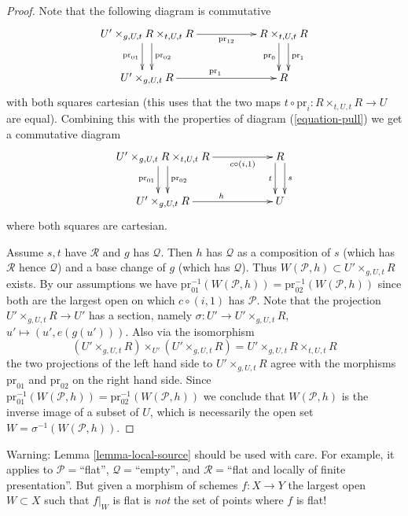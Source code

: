 \begin{proof}
Note that the following diagram is commutative
$$
\xymatrix{
U' \times_{g, U, t} R \times_{t, U, t} R
\ar[rr]_-{\text{pr}_{12}}
\ar@<1ex>[d]^-{\text{pr}_{02}} \ar@<-1ex>[d]_-{\text{pr}_{01}} & &
R \times_{t, U, t} R
\ar@<1ex>[d]^-{\text{pr}_1} \ar@<-1ex>[d]_-{\text{pr}_0}
\\
U' \times_{g, U, t} R \ar[rr]^{\text{pr}_1} & & R
}
$$
with both squares cartesian (this uses that the two maps
$t \circ \text{pr}_i : R \times_{t, U, t} R \to U$ are equal).
Combining this with the properties of diagram (\ref{equation-pull})
we get a commutative diagram
$$
\xymatrix{
U' \times_{g, U, t} R \times_{t, U, t} R
\ar[rr]_-{c \circ (i, 1)}
\ar@<1ex>[d]^-{\text{pr}_{02}} \ar@<-1ex>[d]_-{\text{pr}_{01}} & &
R
\ar@<1ex>[d]^-{s} \ar@<-1ex>[d]_-{t}
\\
U' \times_{g, U, t} R \ar[rr]^h & & U
}
$$
where both squares are cartesian.

\medskip\noindent
Assume $s,t$ have $\mathcal{R}$ and $g$ has $\mathcal{Q}$.
Then $h$ has $\mathcal{Q}$ as a composition of $s$ (which has
$\mathcal{R}$ hence $\mathcal{Q}$) and a base change of $g$ (which
has $\mathcal{Q}$). Thus $W(\mathcal{P}, h) \subset U' \times_{g, U, t} R$
exists. By our assumptions we have
$\text{pr}_{01}^{-1}(W(\mathcal{P}, h)) =
\text{pr}_{02}^{-1}(W(\mathcal{P}, h))$
since both are the largest open on which $c \circ (i, 1)$ has $\mathcal{P}$.
Note that the projection $U' \times_{g, U, t} R \to U'$ has a section, namely
$\sigma : U' \to U' \times_{g, U, t} R$, $u' \mapsto (u', e(g(u')))$.
Also via the isomorphism
$$
(U' \times_{g, U, t} R) \times_{U'} (U' \times_{g, U, t} R)
=
U' \times_{g, U, t} R \times_{t, U, t} R
$$
the two projections of the left hand side
to $U' \times_{g, U, t} R$ agree with the morphisms $\text{pr}_{01}$
and $\text{pr}_{02}$ on the right hand side. Since
$\text{pr}_{01}^{-1}(W(\mathcal{P}, h)) =
\text{pr}_{02}^{-1}(W(\mathcal{P}, h))$
we conclude that $W(\mathcal{P}, h)$ is the inverse image of a subset of $U$,
which is necessarily the open set
$W = \sigma^{-1}(W(\mathcal{P}, h))$.
\end{proof}

\begin{remark}
\label{remark-local-source-warning}
Warning:
Lemma \ref{lemma-local-source}
should be used with care.
For example, it applies to $\mathcal{P}=$``flat'', $\mathcal{Q}=$``empty'',
and $\mathcal{R}=$``flat and locally of finite presentation''. But given a
morphism of schemes $f : X \to Y$ the largest open $W \subset X$ such that
$f|_W$ is flat is {\it not} the set of points where $f$ is flat!
\end{remark}

